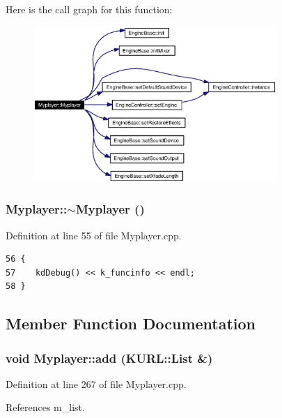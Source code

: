 Here is the call graph for this function:\begin{figure}[H]
\begin{center}
\leavevmode
\includegraphics[width=262pt]{classMyplayer_Myplayera0_cgraph}
\end{center}
\end{figure}
\subsubsection{\setlength{\rightskip}{0pt plus 5cm}Myplayer::$\sim${\bf Myplayer} ()}\label{classMyplayer_Myplayera1}




Definition at line 55 of file Myplayer.cpp.



\footnotesize\begin{verbatim}56 {
57    kdDebug() << k_funcinfo << endl;
58 }
\end{verbatim}\normalsize 


\subsection{Member Function Documentation}
\subsubsection{\setlength{\rightskip}{0pt plus 5cm}void Myplayer::add (KURL::List \&)\hspace{0.3cm}{\tt  [slot]}}\label{classMyplayer_Myplayeri17}




Definition at line 267 of file Myplayer.cpp.

References m\_\-list.

